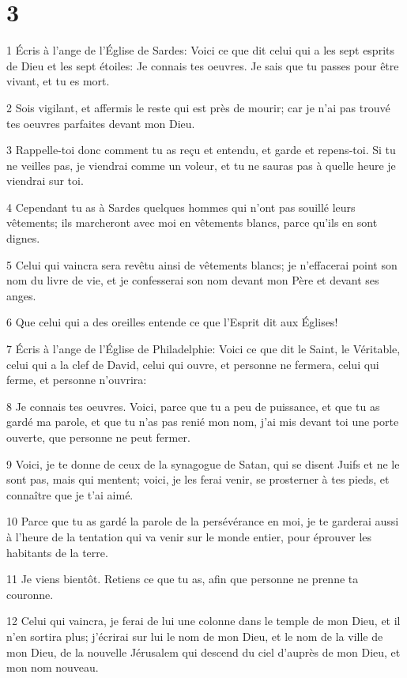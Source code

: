 \chapter{3}

\par 1 Écris à l'ange de l'Église de Sardes: Voici ce que dit celui qui a les sept esprits de Dieu et les sept étoiles: Je connais tes oeuvres. Je sais que tu passes pour être vivant, et tu es mort.
\par 2 Sois vigilant, et affermis le reste qui est près de mourir; car je n'ai pas trouvé tes oeuvres parfaites devant mon Dieu.
\par 3 Rappelle-toi donc comment tu as reçu et entendu, et garde et repens-toi. Si tu ne veilles pas, je viendrai comme un voleur, et tu ne sauras pas à quelle heure je viendrai sur toi.
\par 4 Cependant tu as à Sardes quelques hommes qui n'ont pas souillé leurs vêtements; ils marcheront avec moi en vêtements blancs, parce qu'ils en sont dignes.
\par 5 Celui qui vaincra sera revêtu ainsi de vêtements blancs; je n'effacerai point son nom du livre de vie, et je confesserai son nom devant mon Père et devant ses anges.
\par 6 Que celui qui a des oreilles entende ce que l'Esprit dit aux Églises!
\par 7 Écris à l'ange de l'Église de Philadelphie: Voici ce que dit le Saint, le Véritable, celui qui a la clef de David, celui qui ouvre, et personne ne fermera, celui qui ferme, et personne n'ouvrira:
\par 8 Je connais tes oeuvres. Voici, parce que tu a peu de puissance, et que tu as gardé ma parole, et que tu n'as pas renié mon nom, j'ai mis devant toi une porte ouverte, que personne ne peut fermer.
\par 9 Voici, je te donne de ceux de la synagogue de Satan, qui se disent Juifs et ne le sont pas, mais qui mentent; voici, je les ferai venir, se prosterner à tes pieds, et connaître que je t'ai aimé.
\par 10 Parce que tu as gardé la parole de la persévérance en moi, je te garderai aussi à l'heure de la tentation qui va venir sur le monde entier, pour éprouver les habitants de la terre.
\par 11 Je viens bientôt. Retiens ce que tu as, afin que personne ne prenne ta couronne.
\par 12 Celui qui vaincra, je ferai de lui une colonne dans le temple de mon Dieu, et il n'en sortira plus; j'écrirai sur lui le nom de mon Dieu, et le nom de la ville de mon Dieu, de la nouvelle Jérusalem qui descend du ciel d'auprès de mon Dieu, et mon nom nouveau.
